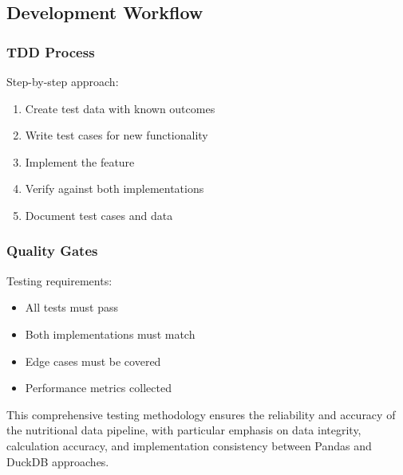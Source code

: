 \subsection{Development Workflow}

\subsubsection{TDD Process}
Step-by-step approach:
\begin{enumerate}
    \item Create test data with known outcomes
    \item Write test cases for new functionality
    \item Implement the feature
    \item Verify against both implementations
    \item Document test cases and data
\end{enumerate}

\subsubsection{Quality Gates}
Testing requirements:
\begin{itemize}
    \item All tests must pass
    \item Both implementations must match
    \item Edge cases must be covered
    \item Performance metrics collected
\end{itemize}

This comprehensive testing methodology ensures the reliability and accuracy of the nutritional data pipeline, with particular emphasis on data integrity, calculation accuracy, and implementation consistency between Pandas and DuckDB approaches.
